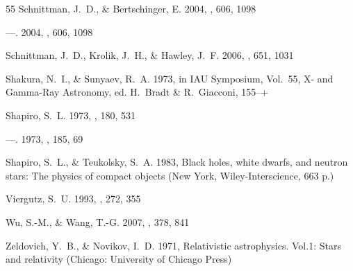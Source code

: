 \documentclass[apj]{emulateapj}
\begin{document}
\begin{thebibliography}{55}
{Schnittman}, J.~D., \& {Bertschinger}, E. 2004{}, \apj, 606, 1098

---. 2004{}, \apj, 606, 1098

{Schnittman}, J.~D., {Krolik}, J.~H., \& {Hawley}, J.~F. 2006, \apj, 651, 1031

{Shakura}, N.~I., \& {Sunyaev}, R.~A. 1973, in IAU Symposium, Vol.~55, X- and
  Gamma-Ray Astronomy, ed. H.~{Bradt} \& R.~{Giacconi}, 155--+

{Shapiro}, S.~L. 1973{}, \apj, 180, 531

---. 1973{}, \apj, 185, 69

{Shapiro}, S.~L., \& {Teukolsky}, S.~A. 1983, {Black holes, white dwarfs, and
  neutron stars: The physics of compact objects} (New York, Wiley-Interscience,
  663 p.)

{Viergutz}, S.~U. 1993, \aap, 272, 355

{Wu}, S.-M., \& {Wang}, T.-G. 2007, \mnras, 378, 841

{Zeldovich}, Y.~B., \& {Novikov}, I.~D. 1971, {Relativistic astrophysics.
  Vol.1: Stars and relativity} (Chicago: University of Chicago Press)

\end{thebibliography}

%
\end{document}
